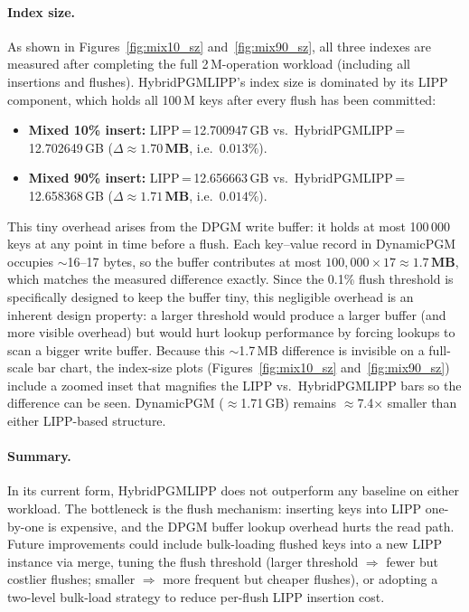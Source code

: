 \documentclass[11pt]{article}
\begin{document}
\paragraph{Index size.}
As shown in Figures~\ref{fig:mix10_sz} and~\ref{fig:mix90_sz}, all three indexes are measured
after completing the full 2\,M-operation workload (including all insertions and flushes).
HybridPGMLIPP's index size is dominated by its LIPP component, which holds all 100\,M keys
after every flush has been committed:
\begin{itemize}
    \item \textbf{Mixed 10\% insert:}
          LIPP\,=\,12.700947\,GB vs.\ HybridPGMLIPP\,=\,12.702649\,GB
          ($\Delta \approx \mathbf{1.70\,MB}$, i.e.\ $0.013\%$).
    \item \textbf{Mixed 90\% insert:}
          LIPP\,=\,12.656663\,GB vs.\ HybridPGMLIPP\,=\,12.658368\,GB
          ($\Delta \approx \mathbf{1.71\,MB}$, i.e.\ $0.014\%$).
\end{itemize}
This tiny overhead arises from the DPGM write buffer: it holds at most 100\,000 keys
at any point in time before a flush.
Each key--value record in DynamicPGM occupies $\sim$16--17 bytes, so the buffer contributes
at most $100{,}000 \times 17 \approx \mathbf{1.7\,MB}$, which matches the measured difference
exactly.
Since the 0.1\% flush threshold is specifically designed to keep the buffer tiny,
this negligible overhead is an inherent design property: a larger threshold would produce a
larger buffer (and more visible overhead) but would hurt lookup performance by forcing
lookups to scan a bigger write buffer.
Because this $\sim$1.7\,MB difference is invisible on a full-scale bar chart, the index-size
plots (Figures~\ref{fig:mix10_sz} and~\ref{fig:mix90_sz}) include a zoomed inset that
magnifies the LIPP vs.\ HybridPGMLIPP bars so the difference can be seen.
DynamicPGM ($\approx$1.71\,GB) remains $\approx$7.4$\times$ smaller than either
LIPP-based structure.

\paragraph{Summary.}
In its current form, HybridPGMLIPP does not outperform any baseline on either workload.
The bottleneck is the flush mechanism: inserting keys into LIPP one-by-one is expensive,
and the DPGM buffer lookup overhead hurts the read path.
Future improvements could include bulk-loading flushed keys into a new LIPP instance via
merge, tuning the flush threshold (larger threshold $\Rightarrow$ fewer but costlier flushes;
smaller $\Rightarrow$ more frequent but cheaper flushes), or adopting a two-level
bulk-load strategy to reduce per-flush LIPP insertion cost.
\end{document}
